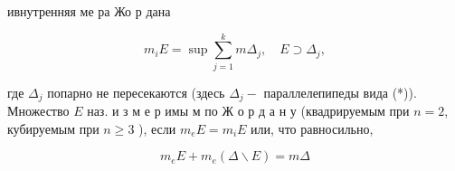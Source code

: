 \documentclass[10pt]{article}
\begin{document}
ивнутренняя ме ра Жо р дана



\[

m_{i} E=\sup \sum_{j=1}^{k} m \Delta_{j}, \quad E \supset \Delta_{j},

\]



где $\Delta_{j}$ попарно не пересекаются (здесь $\Delta_{j}-$ параллелепипеды вида (*)). Множество $E$ наз. и з м е р имы м по Ж о р д а н у (квадрируемым при $n=2$, кубируемым при $n \geqslant 3$ ), если $m_{e} E=m_{i} E$ или, что равносильно,



\[

m_{e} E+m_{e}(\Delta \backslash E)=m \Delta

\]
\end{document}
